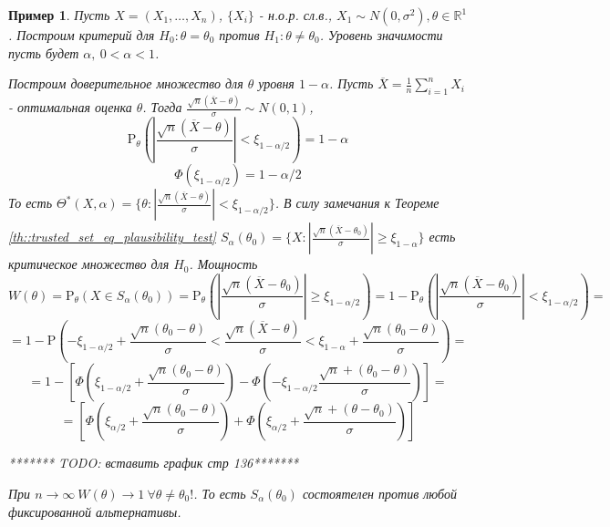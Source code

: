 \documentclass[12pt]{article}
\newtheorem*{example}{Пример}
\theoremstyle{basic_theorem}
\theoremstyle{name_theorem}
\def\R{
    \mathbb{R}
}
\def\P{
    \mathrm{P}
}
\begin{document}
\begin{example}
    Пусть $X=(X_1,\ldots,X_n)$, $\{X_i\}$ - н.о.р. сл.в., $X_1\sim N(0,\sigma^2),\theta\in\R^1$.
    Построим критерий для $H_0:\theta=\theta_0$ против $H_1:\theta\neq\theta_0$.
    Уровень значимости пусть будет $\alpha,\ 0<\alpha<1$.
    
    Построим доверительное множество для $\theta$ уровня $1-\alpha$.
    Пусть $\overline{X}=\frac{1}{n}\sum^n_{i=1}X_i$ - оптимальная оценка $\theta$.
    Тогда $\frac{\sqrt{n}(\overline{X}-\theta)}{\sigma}\sim N(0,1)$,
    $$\P_\theta\left(\left\lvert\frac{\sqrt{n}(\overline{X}-\theta)}{\sigma}\right\rvert<\xi_{1-\alpha/2}\right) = 1-\alpha$$ 
    $$\Phi(\xi_{1-\alpha/2})=1-\alpha/2$$
    То есть $\Theta^*(X,\alpha)=\{\theta:\left\lvert \frac{\sqrt{n}(\overline{X}-\theta)}{\sigma}\right\rvert <\xi_{1-\alpha/2}\}$.
    В силу замечания к Теореме \ref{th::trusted_set_eq_plausibility_test}
    $S_{\alpha}(\theta_0)=\{X:\left\lvert \frac{\sqrt{n}(\overline{X}-\theta_0)}{\sigma}\right\rvert \geq\xi_{1-\alpha}\}$
    есть критическое множество для $H_0$. Мощность
    $$W(\theta)=\P_\theta(X\in S_\alpha(\theta_0))=\P_\theta\left(\left\lvert \frac{\sqrt{n}(\overline{X}-\theta_0)}{\sigma}\right\rvert \geq\xi_{1-\alpha/2}\right)=
    1-\P_\theta\left(\left\lvert \frac{\sqrt{n}(\overline{X}-\theta_0)}{\sigma}\right\rvert <\xi_{1-\alpha/2}\right)=$$
    $$=1-\P\left(-\xi_{1-\alpha/2} + \frac{\sqrt{n}(\theta_0-\theta)}{\sigma} < \frac{\sqrt{n}(\overline{X}-\theta)}{\sigma} < \xi_{1-\alpha}+\frac{\sqrt{n}(\theta_0-\theta)}{\sigma}\right)=$$
    $$=1-\left[\Phi\left(\xi_{1-\alpha/2}+\frac{\sqrt{n}(\theta_0-\theta)}{\sigma}\right) - \Phi\left(-\xi_{1-\alpha/2}\frac{\sqrt{n}+(\theta_0-\theta)}{\sigma}\right)\right] = $$
    $$=\left[\Phi\left(\xi_{\alpha/2}+\frac{\sqrt{n}(\theta_0-\theta)}{\sigma}\right) + \Phi\left(\xi_{\alpha/2}+\frac{\sqrt{n}+(\theta-\theta_0)}{\sigma}\right)\right]$$


    ******* TODO: вставить график стр 136*******


    При $n\rightarrow\infty\ W(\theta)\rightarrow 1\ \forall\theta\neq\theta_0!$.
    То есть $S_\alpha(\theta_0)$ состоятелен против любой фиксированной альтернативы.
\end{example}
\end{document}
